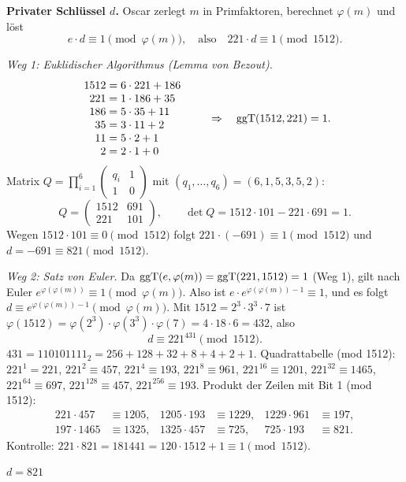  \textbf{Privater Schlüssel $d$.}
Oscar zerlegt $m$ in Primfaktoren, berechnet $\varphi(m)$ und löst
\[
e \cdot d \equiv 1 \pmod{\varphi(m)}, \quad\text{also}\quad 221 \cdot d \equiv 1 \pmod{1512}.
\]

\emph{Weg 1: Euklidischer Algorithmus (Lemma von Bezout).}
\[
\begin{array}{r@{\;=\;}l}
1512 & 6 \cdot 221 + 186\\
221 & 1 \cdot 186 + 35\\
186 & 5 \cdot 35 + 11\\
35 & 3 \cdot 11 + 2\\
11 & 5 \cdot 2 + 1\\
2 & 2 \cdot 1 + 0
\end{array}
\qquad\Rightarrow\quad \ggT(1512, 221) = 1 .
\]
Matrix $Q = \prod_{i=1}^{6} \begin{pmatrix} q_i & 1\\ 1 & 0\end{pmatrix}$ mit $(q_1, \dots, q_6) = (6, 1, 5, 3, 5, 2)$:
\[
Q = \begin{pmatrix} 1512 & 691\\ 221 & 101 \end{pmatrix}, \qquad
\det Q = 1512 \cdot 101 - 221 \cdot 691 = 1 .
\]
Wegen $1512 \cdot 101 \equiv 0 \pmod{1512}$ folgt $221 \cdot (-691) \equiv 1 \pmod{1512}$ und $d = -691 \equiv 821 \pmod{1512}$.

\emph{Weg 2: Satz von Euler.} Da $\operatorname{ggT}(e, \varphi(m)) = \operatorname{ggT}(221, 1512) = 1$ (Weg 1), gilt nach Euler $e^{\varphi(\varphi(m))} \equiv 1 \pmod{\varphi(m)}$. Also ist $e \cdot e^{\varphi(\varphi(m)) - 1} \equiv 1$, und es folgt
$d \equiv e^{\varphi(\varphi(m)) - 1} \pmod{\varphi(m)}$.
Mit $1512 = 2^3 \cdot 3^3 \cdot 7$ ist $\varphi(1512) = \varphi(2^3) \cdot \varphi(3^3) \cdot \varphi(7) = 4 \cdot 18 \cdot 6 = 432$, also
\[
d \equiv 221^{431} \pmod{1512}.
\]
$431 = 110101111_2 = 256 + 128 + 32 + 8 + 4 + 2 + 1$. Quadrattabelle (mod 1512):
$221^{1} = 221$, $221^{2} \equiv 457$, $221^{4} \equiv 193$, $221^{8} \equiv 961$, $221^{16} \equiv 1201$,
$221^{32} \equiv 1465$, $221^{64} \equiv 697$, $221^{128} \equiv 457$, $221^{256} \equiv 193$.
Produkt der Zeilen mit Bit 1 (mod 1512):
\begin{align*}
221 \cdot 457 &\equiv 1205, & 1205 \cdot 193 &\equiv 1229, & 1229 \cdot 961 &\equiv 197,\\
197 \cdot 1465 &\equiv 1325, & 1325 \cdot 457 &\equiv 725, & 725 \cdot 193 &\equiv 821 .
\end{align*}
Kontrolle: $221 \cdot 821 = 181441 = 120 \cdot 1512 + 1 \equiv 1 \pmod{1512}$.
\begin{ergebnis} $d = 821$ \end{ergebnis}

